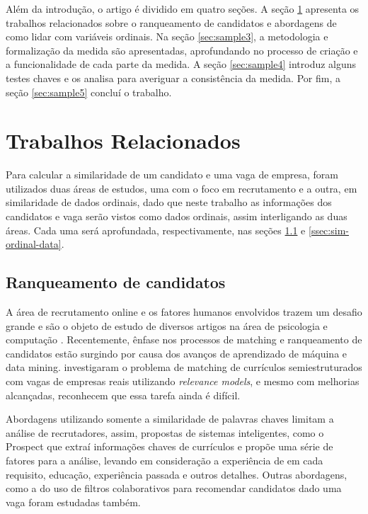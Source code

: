 \documentclass[preprint,12pt]{elsarticle}
\begin{document}
Além da introdução, o artigo é dividido em quatro seções. A seção \ref{sec:sample2} apresenta os trabalhos relacionados sobre o ranqueamento de candidatos e abordagens de como lidar com variáveis ordinais. Na seção \ref{sec:sample3}, a metodologia e formalização da medida são apresentadas, aprofundando no processo de criação e a funcionalidade de cada parte da medida. A seção \ref{sec:sample4} introduz alguns testes chaves e os analisa para averiguar a consistência da medida. Por fim, a seção \ref{sec:sample5} concluí o trabalho.

\section{Trabalhos Relacionados}
\label{sec:sample2}

Para calcular a similaridade de um candidato e uma vaga de empresa, foram utilizados duas áreas de estudos, uma com o foco em recrutamento e a outra, em similaridade de dados ordinais, dado que neste trabalho as informações dos candidatos e vaga serão vistos como dados ordinais, assim interligando as duas áreas. Cada uma será aprofundada, respectivamente, nas seções \ref{ssec:sim-candidate-company} e \ref{ssec:sim-ordinal-data}. 

\subsection{Ranqueamento de candidatos}
\label{ssec:sim-candidate-company}

A área de recrutamento online e os fatores humanos envolvidos trazem um desafio grande e são o objeto de estudo de diversos artigos na área de psicologia \cite{Chapman2005ApplicantAT, Hunter1990IndividualDI, Steel1984ARA} e computação \cite{poch-etal-2014-ranking, Singh2010PROSPECTAS, improve-ranking-candidates-2009, e-gen-job-processing-2007, mochol2006practical, impact-semantic-web-2005, automatic-profiling-2008, matching-field-relevance}. Recentemente, ênfase nos processos de matching e ranqueamento de candidatos estão surgindo por causa dos avanços de aprendizado de máquina e data mining. \cite{matching-field-relevance} investigaram o problema de matching de currículos semiestruturados com vagas de empresas reais utilizando \textit{relevance models}, e mesmo com melhorias alcançadas, reconhecem que essa tarefa ainda é difícil. 

Abordagens utilizando somente a similaridade de palavras chaves limitam a análise de recrutadores, assim, propostas de sistemas inteligentes, como o Prospect \cite{Singh2010PROSPECTAS} que extraí informações chaves de currículos e propõe uma série de fatores para a análise, levando em consideração a experiência de em cada requisito, educação, experiência passada e outros detalhes. Outras abordagens, como a do uso de filtros colaborativos para recomendar candidatos dado uma vaga \cite{needle-haystack-recommender-systems} foram estudadas também. 
\end{document}
